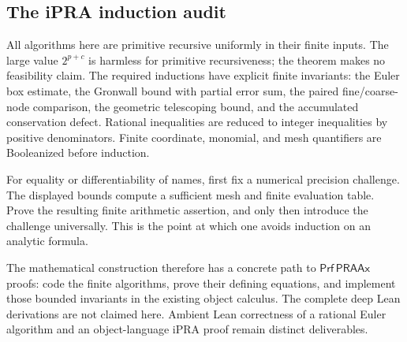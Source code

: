 \subsection{The iPRA induction audit}

All algorithms here are primitive recursive uniformly in their finite
inputs.  The large value $2^{p+c}$ is harmless for primitive recursiveness;
the theorem makes no feasibility claim.  The required inductions have
explicit finite invariants: the Euler box estimate, the Gronwall bound
with partial error sum, the paired fine/coarse-node comparison, the
geometric telescoping bound, and the accumulated conservation defect.
Rational inequalities are reduced to integer inequalities by positive
denominators.  Finite coordinate, monomial, and mesh quantifiers are
Booleanized before induction.

For equality or differentiability of names, first fix a numerical
precision challenge.  The displayed bounds compute a sufficient mesh
and finite evaluation table.  Prove the resulting finite arithmetic
assertion, and only then introduce the challenge universally.  This is
the point at which one avoids induction on an analytic formula.

The mathematical construction therefore has a concrete path to
$\mathsf{Prf}\,\mathsf{PRAAx}$ proofs: code the finite algorithms, prove
their defining equations, and implement those bounded invariants in the
existing object calculus.  The complete deep Lean derivations are not
claimed here.  Ambient Lean correctness of a rational Euler algorithm
and an object-language iPRA proof remain distinct deliverables.
